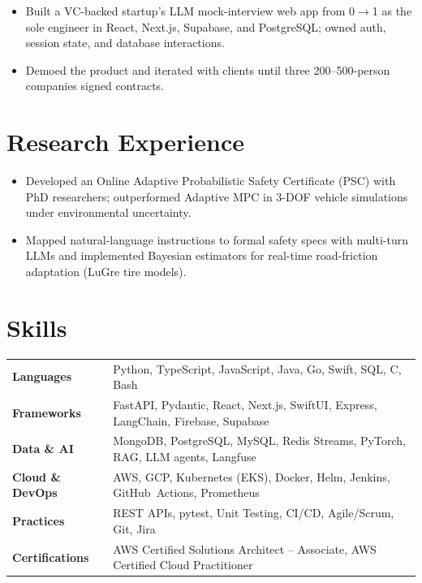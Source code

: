 \documentclass[11pt, letterpaper]{article}
\begin{document}
\vspace{1pt}
\begin{itemize}
  \item Built a VC-backed startup's LLM mock-interview web app from 0$\to$1 as the sole engineer in React, Next.js, Supabase, and PostgreSQL; owned auth, session state, and database interactions.
  \item Demoed the product and iterated with clients until three 200--500-person companies signed contracts.
\end{itemize}

\section{Research Experience}
\begin{itemize}
  \item Developed an Online Adaptive Probabilistic Safety Certificate (PSC) with PhD researchers; outperformed Adaptive MPC in 3-DOF vehicle simulations under environmental uncertainty.
  \item Mapped natural-language instructions to formal safety specs with multi-turn LLMs and implemented Bayesian estimators for real-time road-friction adaptation (LuGre tire models).
\end{itemize}

\section{Skills}
\begin{tabularx}{\textwidth}{@{}l @{\hspace{7pt}} >{\raggedright\arraybackslash}X@{}}
  \textbf{Languages} & Python, TypeScript, JavaScript, Java, Go, Swift, SQL, C, Bash \\[1pt]
  \textbf{Frameworks} & FastAPI, Pydantic, React, Next.js, SwiftUI, Express, LangChain, Firebase, Supabase \\[1pt]
  \textbf{Data \& AI} & MongoDB, PostgreSQL, MySQL, Redis Streams, PyTorch, RAG, LLM agents, Langfuse \\[1pt]
  \textbf{Cloud \& DevOps} & AWS, GCP, Kubernetes (EKS), Docker, Helm, Jenkins, GitHub~Actions, Prometheus \\[1pt]
  \textbf{Practices} & REST APIs, pytest, Unit Testing, CI/CD, Agile/Scrum, Git, Jira \\[1pt]
  \textbf{Certifications} & AWS Certified Solutions Architect -- Associate, AWS Certified Cloud Practitioner \\
\end{tabularx}
\end{document}
